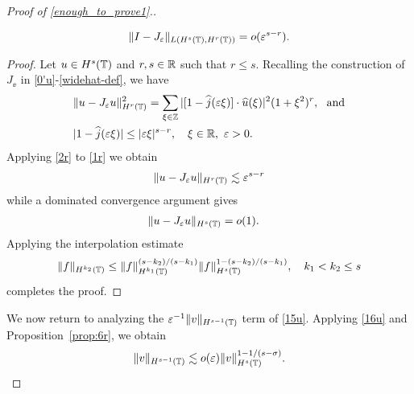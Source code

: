 \begin{proof}[Proof of \eqref{enough_to_prove1}.]
\begin{lemma}
\begin{equation}
\label{0r}
\begin{split}
\|I - J_\varepsilon\|_{L(H^s(\mathbb{T}), H^r(\mathbb{T}))} = o(\varepsilon^{s-r}).
\end{split}
\end{equation}
%
%
\end{lemma}
%
%
\begin{proof}
Let $u \in H^s(\mathbb{T})$ and $r, s \in \mathbb{R}$ such that $r \le s$. 
Recalling the construction of $J_\ee$ in
\eqref{0'u}-\eqref{widehat-def}, we have
%
%
\begin{align}
\label{1r}
& \|u - J_\varepsilon u\|_{H^r(\mathbb{T})}^2 = \sum_{\xi \in \mathbb{Z}} | [1- \widehat{j}(\varepsilon 
\xi)] \cdot \widehat{u}(\xi) |^2
(1+\xi^2)^r, \ \ \text{and}
\\
& |1 - \widehat{j}(\varepsilon \xi)| \le |\varepsilon \xi |^{s-r}, \quad 
\xi \in \mathbb{R}, \ \varepsilon > 0.
\label{2r}
\end{align}
%
%
Applying \eqref{2r} to \eqref{1r} we obtain
%
%
\begin{equation*}
\label{2pr}
\begin{split}
\|u - J_\varepsilon u\|_{H^r(\mathbb{T})}
\lesssim \varepsilon^{s-r}
\end{split}
\end{equation*}
%
%
%
%
while a dominated convergence argument gives
%
%
\begin{equation*}
\label{o1}
\begin{split}
\|u - J_\varepsilon u \|_{H^s(\mathbb{T}) } & = o(1).
\end{split}
\end{equation*}
%
%
%
%
Applying the interpolation estimate 
%
%
\begin{equation}
\begin{split}
\|f\|_{H^{k_2}(\mathbb{T})} \le
\|f\|_{H^{k_1}(\mathbb{T})}^{(s-k_2)/(s -k_1 )}
\|f\|_{H^s(\mathbb{T})}^{1 - (s-k_2)/(s -k_1 )}, \quad k_1 < k_2 \le s
\label{16u}
\end{split}
\end{equation}
%
%
%
%
%
%
completes the proof. 
%
\end{proof}
We now return to analyzing the $\varepsilon^{-1}
\|v\|_{H^{s-1}(\mathbb{T})} $ term of \eqref{15u}.
Applying \eqref{16u} and Proposition~\ref{prop:6r}, 
we obtain
%
%
%
%
$$
\|v\|_{H^{s-1}(\mathbb{T})}  \lesssim o(\varepsilon) 
\|v\|_{H^s(\mathbb{T})}^{1-
1/(s- \sigma)}.
$$


\end{proof}
